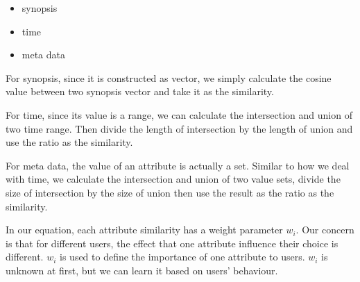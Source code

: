 \begin{itemize}
\item synopsis
\item time
\item meta data
\end{itemize}

For synopsis, since it is constructed as vector, we simply calculate the cosine value between
two synopsis vector and take it as the similarity.

For time, since its value is a range, we can calculate the intersection and union of two time
range. Then divide the length of intersection by the length of union and use the ratio as
the similarity.

For meta data, the value of an attribute is actually a set. Similar to how we deal with time,
we calculate the intersection and union of two value sets, divide the size of intersection by
the size of union then use the result as the ratio as the similarity.

In our equation, each attribute similarity has a weight parameter $w_i$. Our concern is that
for different users, the effect that one attribute influence their choice is different. $w_i$ is
used to define the importance of one attribute to users. $w_i$ is unknown at first, but we
can learn it based on users' behaviour.




















